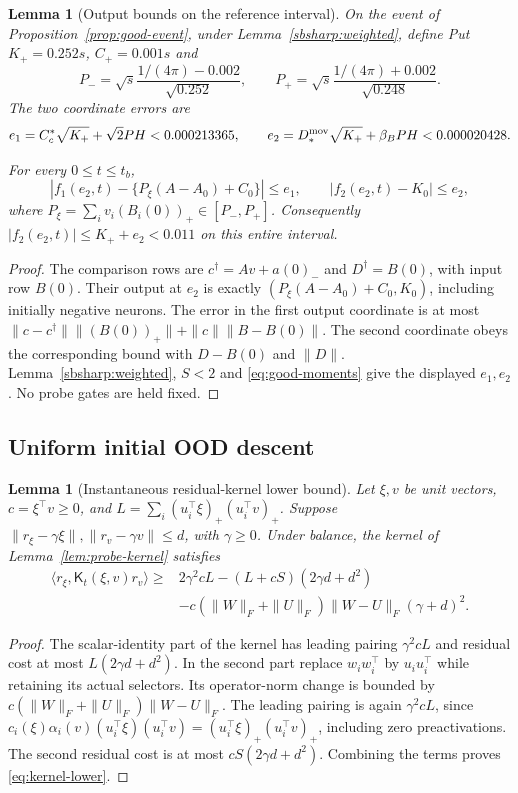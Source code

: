 \documentclass[10pt]{article}
\newtheorem{lemma}[theorem]{Lemma}
\theoremstyle{remark}\newtheorem{remark}[theorem]{Remark}
\begin{document}
\begin{lemma}[Output bounds on the reference interval]\label{lem:output-envelope}
On the event of Proposition~\ref{prop:good-event}, under
Lemma~\ref{sbsharp:weighted}, define
Put $K_+=0.252s$, $C_+=0.001s$ and
\[
 P_-=\sqrt{s}\frac{1/(4\pi)-0.002}{\sqrt{0.252}},\qquad
 P_+=\sqrt{s}\frac{1/(4\pi)+0.002}{\sqrt{0.248}}.
\]
The two coordinate errors are
\[
 e_1=C_c^*\sqrt{K_+}+\sqrt2PH<0.000213365,\qquad
 e_2=D_*^{\rm mov}\sqrt{K_+}+\beta_BPH<0.000020428.
\]

For every $0\le t\le t_b$,
\[
 |f_1(e_2,t)-\{P_\xi(A-A_0)+C_0\}|\le e_1,\qquad
 |f_2(e_2,t)-K_0|\le e_2,
\]
where $P_\xi=\sum_i v_i(B_i(0))_+\in[P_-,P_+]$.
Consequently $|f_2(e_2,t)|\le K_++e_2<0.011$ on this entire interval.
\end{lemma}
\begin{proof}
The comparison rows are $c^\dagger=Av+a(0)_-$ and $D^\dagger=B(0)$,
with input row $B(0)$. Their output at $e_2$ is exactly
$(P_\xi(A-A_0)+C_0,K_0)$, including initially negative neurons.
The error in the first output coordinate is at most
$\|c-c^\dagger\|\|(B(0))_+\|+\|c\|\|B-B(0)\|$.
The second coordinate obeys the corresponding bound with
$D-B(0)$ and $\|D\|$. Lemma~\ref{sbsharp:weighted}, $S<2$ and
\eqref{eq:good-moments} give the displayed $e_1,e_2$.
No probe gates are held fixed.
\end{proof}


\subsection{Uniform initial OOD descent}
\begin{lemma}[Instantaneous residual-kernel lower bound]\label{lem:kernel-lower}
Let $\xi,v$ be unit vectors, $c=\xi^\top v\ge0$, and
$L=\sum_i(u_i^\top\xi)_+(u_i^\top v)_+$.
Suppose $\|r_\xi-\gamma\xi\|,\|r_v-\gamma v\|\le d$, with $\gamma\ge0$.
Under balance, the kernel of Lemma~\ref{lem:probe-kernel} satisfies
\begin{align}\label{eq:kernel-lower}
 \langle r_\xi,\mathsf K_t(\xi,v)r_v\rangle
 \ge{}&2\gamma^2cL-(L+cS)(2\gamma d+d^2)\nonumber\\
 &-c(\|W\|_F+\|U\|_F)\|W-U\|_F(\gamma+d)^2.
\end{align}
\end{lemma}
\begin{proof}
The scalar-identity part of the kernel has leading pairing
$\gamma^2cL$ and residual cost at most $L(2\gamma d+d^2)$.
In the second part replace $w_iw_i^\top$ by $u_iu_i^\top$ while retaining
its actual selectors. Its operator-norm change is bounded by
$c(\|W\|_F+\|U\|_F)\|W-U\|_F$.
The leading pairing is again $\gamma^2cL$, since
$c_i(\xi)\alpha_i(v)(u_i^\top\xi)(u_i^\top v)
=(u_i^\top\xi)_+(u_i^\top v)_+$, including zero preactivations.
The second residual cost is at most $cS(2\gamma d+d^2)$.
Combining the terms proves \eqref{eq:kernel-lower}.
\end{proof}
\end{document}
